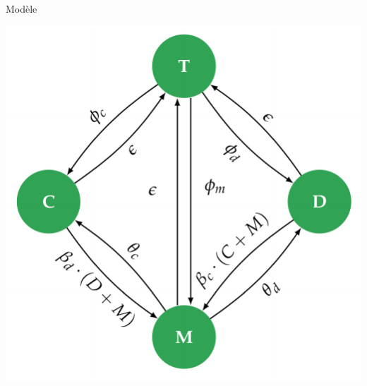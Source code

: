\documentclass{eecslides}
\begin{document}

	\begin{frame}{Modèle}
		\begin{center}
			\includegraphics[height=0.6\textheight]{model}
		\end{center}
	\end{frame}

\end{document}
